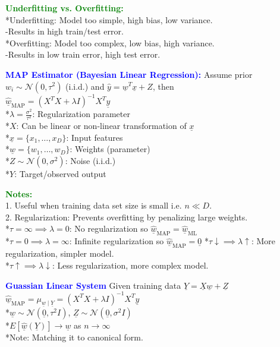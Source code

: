 \documentclass[5pt]{extarticle} %
\begin{document}
\begin{paracol}{3}
{    \textcolor{green}{\textbf{Underfitting vs. Overfitting:}} \\
    *Underfitting: Model too simple, high bias, low variance. \\
    -Results in high train/test error. \\
    *Overfitting: Model too complex, low bias, high variance. \\
    -Results in low train error, high test error. 

    \textcolor{blue}{\textbf{MAP Estimator (Bayesian Linear Regression):}} Assume prior $w_i\sim \mathcal{N}(0, \tau^2)$ (i.i.d.) and 
     $\hat{y} = \underline{w}^T \underline{x} + Z$, then \\
    $\hat{\underline{w}}_{\text{MAP}} = (X^T X + \lambda I)^{-1} X^T \underline{y}$ \\
    *$\lambda = \frac{\sigma^2}{\tau^2}$: Regularization parameter \\
    *$X$: Can be linear or non-linear transformation of $\underline{x}$ \\
    *$\underline{x}  = \{x_1, \ldots, x_D\}$: Input features \\
    *$\underline{w} = \{w_1, \ldots, w_D\}$: Weights (parameter) \\
    *$Z\sim \mathcal{N}(0, \sigma^2)$: Noise (i.i.d.) \\
    *$Y$: Target/observed output 

    \textcolor{green}{\textbf{Notes:}} \\
    1. Useful when training data set size is small i.e. $n \ll D$. \\
    2. Regularization: Prevents overfitting by penalizing large weights. \\
    *$\tau = \infty \implies \lambda = 0$: No regularization so $\hat{\underline{w}}_{\text{MAP}} = \hat{\underline{w}}_{\text{ML}}$ \\
    *$\tau = 0 \implies \lambda = \infty$: Infinite regularization so $\hat{\underline{w}}_{\text{MAP}} = \underline{0}$
    *$\tau \downarrow \implies \lambda \uparrow$: More regularization, simpler model. \\
    *$\tau \uparrow \implies \lambda \downarrow$: Less regularization, more complex model.

    \textcolor{blue}{\textbf{Guassian Linear System}} Given training data $\underline{Y} = \underline{X} \underline{w} + \underline{Z}$ \\ 
    $\hat{\underline{w}}_{\text{MAP}} = \mu_{\underline{w} \mid \underline{Y}} = (X^T X + \lambda I)^{-1} X^T \underline{y}$ \\ 
    *$\underline{w} \sim \mathcal{N} (\underline{0}, \tau^2 I)$, $\underline{Z} \sim \mathcal{N} (\underline{0}, \sigma^2 I)$ \\
    *$E[\hat{\underline{w}} (\underline{Y})] \rightarrow \underline{w}$ as $n \rightarrow \infty$ \\
    *Note: Matching it to canonical form. 

}
\end{paracol}
\end{document}
